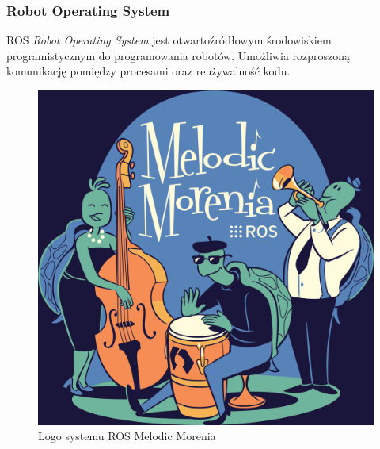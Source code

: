 
\begin{frame}
	\frametitle{Robot Operating System}
	\begin{block}{ROS}
		\textit{Robot Operating System} jest otwartoźródłowym środowiskiem programistycznym do programowania robotów.
		Umożliwia rozproszoną komunikację pomiędzy procesami oraz reużywalność kodu.
	\end{block}
	\medskip
	\begin{figure}
		\includegraphics[scale=0.2]{./images/ros-melodic.png}
		\caption{\normalsize{Logo systemu ROS Melodic Morenia}}
	\end{figure}
\end{frame}


